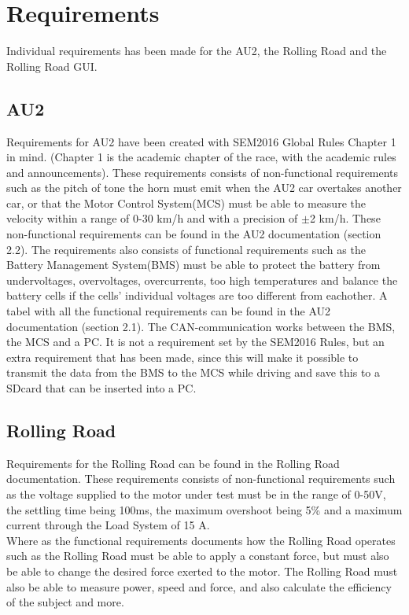 \chapter{Requirements}
Individual requirements has been made for the AU2, the Rolling Road and the Rolling Road GUI.

\section{AU2}
Requirements for AU2 have been created with SEM2016 Global Rules Chapter 1 in mind. (Chapter 1 is the academic chapter of the race, with the academic rules and announcements). These requirements consists of non-functional requirements such as the pitch of tone the horn must emit when the AU2 car overtakes another car, or that the Motor Control System(MCS) must be able to measure the velocity within a range of 0-30 km/h and with a precision of $\pm$2 km/h. These non-functional requirements can be found in the AU2 documentation\cite{AU2} (section 2.2). The requirements also consists of functional requirements such as the Battery Management System(BMS) must be able to protect the battery from undervoltages, overvoltages, overcurrents, too high temperatures and balance the battery cells if the cells' individual voltages are too different from eachother. A tabel with all the functional requirements can be found in the AU2 documentation\cite{AU2} (section 2.1). The CAN-communication works between the BMS, the MCS and a PC. It is not a requirement set by the SEM2016 Rules, but an extra requirement that has been made, since this will make it possible to transmit the data from the BMS to the MCS while driving and save this to a SDcard that can be inserted into a PC.

\section{Rolling Road}
Requirements for the Rolling Road can be found in the Rolling Road documentation\cite{RR}.
These requirements consists of non-functional requirements such as the voltage supplied to the motor under test must be in the range of 0-50V, the settling time being 100ms, the maximum overshoot being 5\% and a maximum current through the Load System of 15 A.\\
Where as the functional requirements documents how the Rolling Road operates such as the Rolling Road must be able to apply a constant force, but must also be able to change the desired force exerted to the motor. The Rolling Road must also be able to measure power, speed and force, and also calculate the efficiency of the subject and more.

